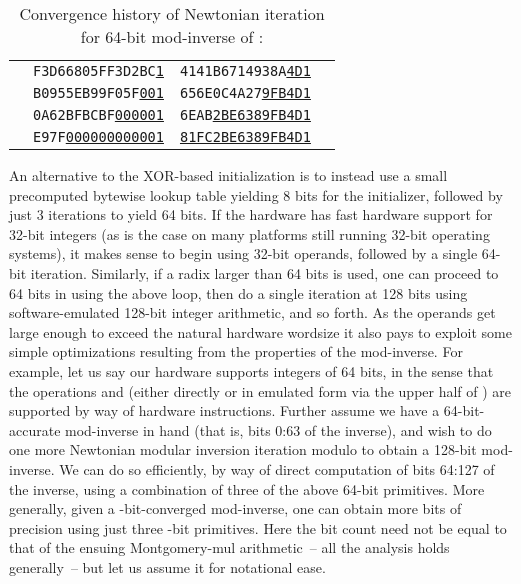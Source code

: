 \documentclass{article}
\begin{document}
\begin{table}[ht]
\begin{center}
\caption{\label{table_iter64}Convergence history of Newtonian iteration for 64-bit mod-inverse of :}
\begin{tabular}{c|c|c|c}
	&		&	 &	\\
\hline
	& {\tt F3D66805FF3D2BC\underline{1}}	& {\tt 4141B6714938A\underline{4D1}}	&		\\
	& {\tt B0955EB99F05F\underline{001}}	& {\tt 656E0C4A27\underline{9FB4D1}}	&		\\
	& {\tt 0A62BFBCBF\underline{000001}}	& {\tt 6EAB\underline{2BE6389FB4D1}}	&		\\
	& {\tt E97F\underline{000000000001}}	& {\tt \underline{81FC2BE6389FB4D1}}	&	
\end{tabular}
\end{center}
\end{table}


\vspace{-0.1in}
An alternative to the XOR-based initialization is to instead use a small precomputed bytewise lookup table yielding 8 bits for the initializer, followed by just 3 iterations to yield 64 bits. 
If the hardware has fast hardware support for 32-bit integers (as is the case on many platforms still running 32-bit operating systems), it makes sense to begin using 32-bit operands, followed by a single 64-bit iteration. Similarly, if a radix larger than 64 bits is used, one can proceed to 64 bits in  using the above loop, then do a single iteration at 128 bits using software-emulated 128-bit integer arithmetic, and so forth. As the operands get large enough to exceed the natural hardware wordsize  it also pays to exploit some simple optimizations resulting from the properties of the mod-inverse. For example, let us say our hardware supports integers of 64 bits, in the sense that the operations  and  (either directly or in emulated form via the upper half of ) are supported by way of hardware instructions. Further assume we have a 64-bit-accurate mod-inverse in hand (that is, bits 0:63 of the inverse), and wish to do one more Newtonian modular inversion iteration modulo  to obtain a 128-bit mod-inverse. We can do so efficiently, by way of direct computation of bits 64:127 of the inverse, using a combination of three of the above 64-bit  primitives. More generally, given a -bit-converged mod-inverse, one can obtain  more bits of precision using just three -bit  primitives. Here the bit count  need not be equal to that of the ensuing Montgomery-mul arithmetic~-- all the analysis holds generally~-- but let us assume it for notational ease.
\end{document}
